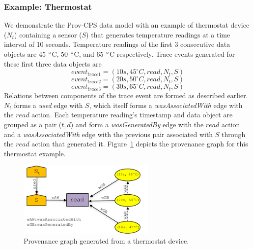 \subsubsection{Example: Thermostat}

We demonstrate the Prov-CPS data model with an example of thermostat device ($N_t$) containing a sensor ($S$) that generates temperature readings at a time interval of 10 seconds. Temperature readings of the first 3 consecutive data objects are 45 $\degree$C, 50 $\degree$C, and 65 $\degree$C respectively. Trace events generated for these first three data objects are
\[event_{trace1} = (10 s, 45 ^{\circ}C, read, N_t, S)\]  
\[event_{trace2} = (20 s, 50 ^{\circ}C, read, N_t, S)\]  
\[event_{trace3} = (30 s, 65 ^{\circ}C, read, N_t, S)\]
Relations between components of the trace event are formed as described earlier. $N_t$ forms a \textit{used} edge with $S$, which itself forms a \textit{wasAssociatedWith} edge with the $read$ action. Each temperature reading's timestamp and data object are grouped as a pair ($t, d$) and form a \textit{wasGeneratedBy} edge with the $read$ action and a \textit{wasAssociatedWith} edge with the previous pair associated with $S$ through the $read$ action that generated it. Figure~\ref{prov_sensor} depicts the provenance graph for this thermostat example.

\begin{figure}[h!]
\begin{center}

\includegraphics[width=0.6\textwidth]{prov_sensor_v3.pdf}
\end{center}
\caption{Provenance graph generated from a thermostat device.}
\label{prov_sensor}
\end{figure}









